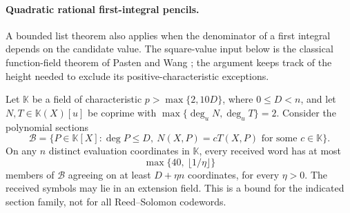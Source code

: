 \paragraph{Quadratic rational first-integral pencils.}
A bounded list theorem also applies when the denominator of a first
integral depends on the candidate value.  The square-value input below
is the classical function-field theorem of Pasten and Wang
\cite[Theorem~3]{pasten-wang-buchi}; the argument keeps track of the
height needed to exclude its positive-characteristic exceptions.

\begin{theorem}\label{thm:quadratic-rational-pencil-list}
Let $\mathbb K$ be a field of characteristic $p>\max\{2,10D\}$,
where $0\le D<n$, and let $N,T\in\mathbb K(X)[u]$ be coprime with
$\max\{\deg_u N,\deg_u T\}=2$.
Consider the polynomial sections
\[
 \mathcal B=\{P\in\mathbb K[X]:\deg P\le D,
       \ N(X,P)=cT(X,P)\text{ for some }c\in\mathbb K\}.
\]
On any $n$ distinct evaluation coordinates in $\mathbb K$, every received word has
at most
\[
 \max\{40,\ \lfloor 1/\eta\rfloor\}
\]
members of $\mathcal B$ agreeing on at least $D+\eta n$ coordinates,
for every $\eta>0$.  The received symbols may lie in an extension
field.  This is a bound for the indicated section family, not for
all Reed--Solomon codewords.
\end{theorem}
